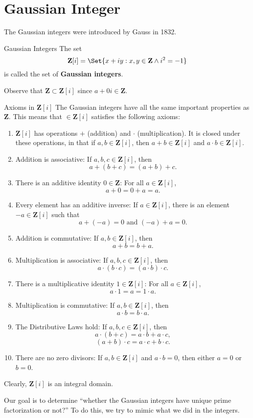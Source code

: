 \section{Gaussian Integer}
The Gaussian integers were introduced by Gauss in 1832.
\begin{Definition}{Gaussian Integers}{}
    The set
    \[ \mathbf{Z}[i]=\Set{x+iy\given x,y\in\mathbf{Z}\land i^2=-1} \]
    is called the set of \textbf{Gaussian integers}.
\end{Definition}
Observe that $ \mathbf{Z}\subset\mathbf{Z}[i] $ since $ a+0i\in\mathbf{Z} $.
\begin{Definition}{Axioms in $ \mathbf{Z}[i] $}{}
    The Gaussian integers have all the same important properties as $ \mathbf{Z} $. This means
    that $ \in\mathbf{Z}[i] $ satisfies the following axioms:
    \begin{enumerate}[label=V\arabic*]
        \item $ \mathbf{Z}[i] $ has operations $ + $ (addition) and $ \cdot $ (multiplication). It is closed
              under these operations, in that if $ a,b\in\mathbf{Z}[i] $, then $ a+b\in\mathbf{Z}[i] $ and $ a\cdot b\in\mathbf{Z}[i] $.
        \item Addition is associative: If $ a,b,c\in\mathbf{Z}[i] $, then
              \[ a+(b+c)=(a+b)+c. \]
        \item There is an additive identity $ 0\in\mathbf{Z} $: For all $ a\in\mathbf{Z}[i] $,
              \[ a+0=0+a=a. \]
        \item Every element has an additive inverse: If $ a\in\mathbf{Z}[i] $, there is an element $ -a\in\mathbf{Z}[i] $ such that
              \[ a+(-a)=0\text{ and }(-a)+a=0. \]
        \item Addition is commutative: If $ a,b\in\mathbf{Z}[i] $, then
              \[ a+b=b+a. \]
        \item Multiplication is associative: If $ a,b,c\in\mathbf{Z}[i] $, then
              \[ a\cdot(b\cdot c)=(a\cdot b)\cdot c. \]
        \item There is a multiplicative identity $ 1\in\mathbf{Z}[i] $: For all $ a\in\mathbf{Z}[i] $,
              \[ a\cdot 1=a=1\cdot a. \]
        \item Multiplication is commutative: If $ a,b\in\mathbf{Z}[i] $, then
              \[ a\cdot b=b\cdot a. \]
        \item The Distributive Laws hold: If $ a,b,c\in\mathbf{Z}[i] $, then
              \[ a\cdot (b+c)=a\cdot b+a\cdot c, \]
              \[ (a+b)\cdot c=a\cdot c+b\cdot c. \]
        \item There are no zero divisors: If $ a,b\in\mathbf{Z}[i] $ and $ a\cdot b=0 $, then either
              $ a=0 $ or $ b=0 $.
    \end{enumerate}
    Clearly, $ \mathbf{Z}[i] $ is an integral domain.
\end{Definition}
Our goal is to determine ``whether the Gaussian integers have unique prime
factorization or not?'' To do this, we try to mimic what we did in the integers.

